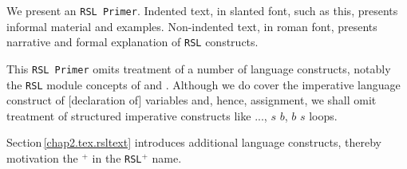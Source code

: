 
\label{chap2.tex.RSL}
\label{begin-of-rsl}\label{RSL-intro}
\minitoc

\renewcommand{\nrslframebox}[2]{\vspace*{2mm} 
                               \boiteepaisseavecuntitre{#1}
                               #2
                               \endboiteepaisseavecuntitre
}

%

We present an \texttt{RSL Primer}. Indented text, in slanted font, such as
  this, presents informal material and examples. Non-indented text, in
  {{\rm roman font}}, presents narrative and formal explanation of
  \texttt{RSL} constructs.

This  \texttt{RSL Primer} omits treatment of a number of language
constructs, notably the \texttt{RSL} module concepts of
 and . Although we do cover the 
imperative language construct of [declaration of] variables and,
hence, assignment, we shall omit treatment of structured imperative 
constructs like   ...,
        $s$  $b$,
        $b$  $s$ loops.

Section\,\vref{chap2.tex.rsltext} introduces additional language constructs, thereby
motivation the $^+$ in the \texttt{RSL$^+$} name.

